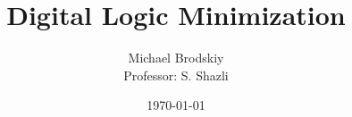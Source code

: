 


\pagestyle{fancy}

\title{Digital Logic Minimization}
\date{\today}
\author{Michael Brodskiy\\ \small Professor: S. Shazli}



\maketitle

\thispagestyle{fancy}

\newpage

